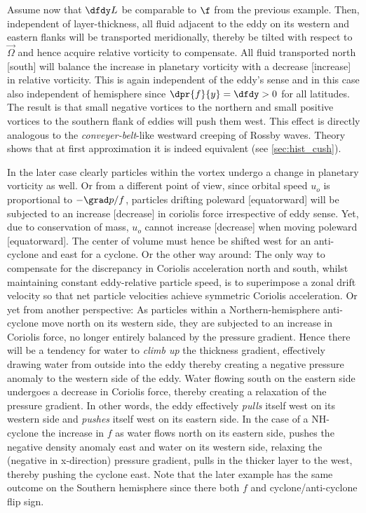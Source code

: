 \begin{driftspeed}
\label{box:speed_planlift}
Assume now that $\dfdy L$ be comparable to $\f$ from the previous example.
Then, independent of layer-thickness, all fluid adjacent to the eddy on its western and eastern flanks will be transported meridionally, thereby be tilted with respect to $\vec{\Omega}$ and hence acquire relative vorticity to compensate.
All fluid transported north [south] will balance the increase in planetary vorticity with a decrease [increase] in relative vorticity. This is again independent of the eddy's sense and in this case also independent of hemisphere since $\dpr{f}{y}=\dfdy>0$ for all latitudes. The result is that small negative vortices to the northern and small positive vortices to the southern flank of eddies will push them west. This effect is directly analogous to the \textit{conveyer-belt}-like westward creeping of Rossby waves. Theory shows that at first approximation it is indeed equivalent (see \eg \cref{sec:hist_cush}).  
\end{driftspeed}
\begin{driftspeed}
\label{box:speed_beta}
In the later case clearly particles within the vortex undergo a change in planetary vorticity as well.
Or from a different point of view, since orbital speed $u_{o}$ is proportional to $-\grad p / f$, particles drifting poleward [equatorward] will be subjected to an increase [decrease] in coriolis force irrespective of eddy sense. Yet, due to conservation of mass, $u_{o}$ cannot increase [decrease] when moving poleward [equatorward].
The center of volume must hence be shifted west for an anti-cyclone and east for a cyclone.
Or the other way around: The only way to compensate for the discrepancy in Coriolis acceleration north and south, whilst maintaining constant eddy-relative particle speed, is to superimpose a zonal drift velocity so that net particle velocities achieve symmetric Coriolis acceleration. Or yet from another perspective: As particles within a Northern-hemisphere anti-cyclone move north on its western side, they are subjected to an increase in Coriolis force, no longer entirely balanced by the pressure gradient. Hence there will be a tendency for water to \textit{climb up} the thickness gradient, effectively drawing water from outside into the eddy thereby creating a negative pressure anomaly to the western side of the eddy. Water flowing south on the eastern side undergoes a decrease in Coriolis force, thereby creating a relaxation of the pressure gradient. In other words, the eddy effectively \textit{pulls} itself west on its western side and \textit{pushes} itself west on its eastern side. In the case of a NH-cyclone the increase in $f$ as water flows north on its eastern side, pushes the negative density anomaly east and water on its western side, relaxing the (negative in x-direction) pressure gradient, pulls in the thicker layer to the west, thereby pushing the cyclone east. Note that the later example has the same outcome on the Southern hemisphere since there both $f$ and cyclone/anti-cyclone flip sign.  
\end{driftspeed}


